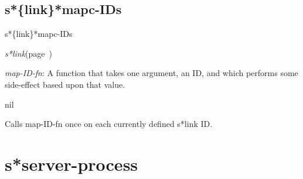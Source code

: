 \subsection{s*\{link\}*mapc-IDs}
\label{s*link*mapc-IDs}

\begin{description}
\item [Name:]  s*\{link\}*mapc-IDs

\item [Class:] {\sl s*link}\hfill(page~\pageref{s*link})

\item [Parameters:]
\item {\sl map-ID-fn}:  A function that takes one argument, an ID,
and which performs some side-effect based upon that
value.



\item [Return-value:] nil

\item [Description:]

Calls map-ID-fn once on each currently defined
s*link ID.

\item [Public:]



\end{description}
\horizontalline

\section{s*server-process}
\label{s*server-process}

